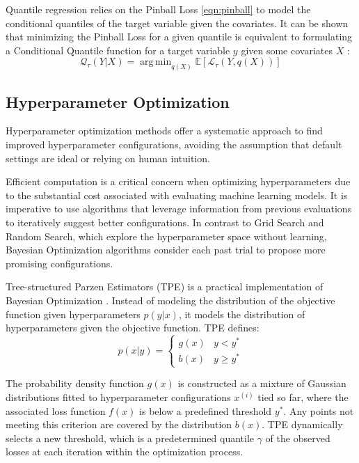 \documentclass{IEEEtran}
\DeclareMathOperator*{\argmin}{arg\,min}
\begin{document}
            Quantile regression relies on the Pinball Loss \eqref{eqn:pinball} to model the conditional quantiles of the target variable given the covariates. It can be shown that minimizing the Pinball Loss for a given quantile is equivalent to formulating a Conditional Quantile function for a target variable $y$ given some covariates $X$ \cite{koenker2001quantile}:
            \begin{equation}
                \mathcal{Q}_\tau(Y | X) = \argmin_{q(X)} \mathbb{E}[\mathcal{L}_\tau(Y, q(X))]
            \end{equation}

        \subsection{Hyperparameter Optimization} \label{sec:hyperparameter}

            Hyperparameter optimization methods offer a systematic approach to find improved hyperparameter configurations, avoiding the assumption that default settings are ideal or relying on human intuition.

            Efficient computation is a critical concern when optimizing hyperparameters due to the substantial cost associated with evaluating machine learning models. It is imperative to use algorithms that leverage information from previous evaluations to iteratively suggest better configurations. In contrast to Grid Search and Random Search, which explore the hyperparameter space without learning, Bayesian Optimization algorithms consider each past trial to propose more promising configurations.

            Tree-structured Parzen Estimators (TPE) is a practical implementation of Bayesian Optimization \cite{bergstra2011algorithms}. Instead of modeling the distribution of the objective function given hyperparameters $p(y|x)$, it models the distribution of hyperparameters given the objective function. TPE defines:
            \begin{equation}
                p(x|y) = \begin{cases}
                    g(x) & y < y^{*} \\
                    b(x) & y \geq y^{*}
                \end{cases}
            \end{equation}

            The probability density function $g(x)$ is constructed as a mixture of Gaussian distributions fitted to hyperparameter configurations ${x^{(i)}}$ tied so far, where the associated loss function $f(x)$ is below a predefined threshold $y^{*}$. Any points not meeting this criterion are covered by the distribution $b(x)$. TPE dynamically selects a new threshold, which is a predetermined quantile $\gamma$ of the observed losses at each iteration within the optimization process.
\end{document}
